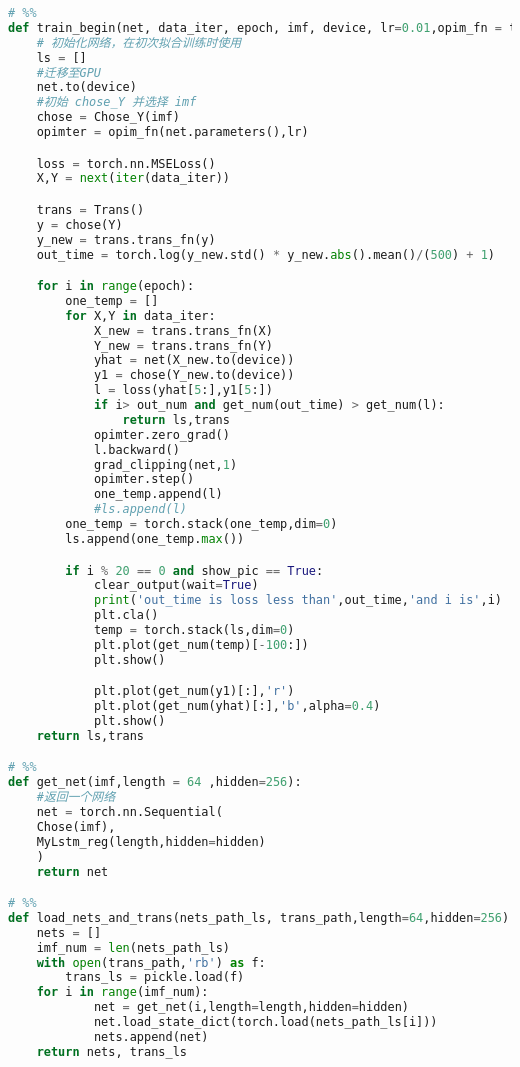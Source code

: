 \begin{appendices}
\begin{lstlisting}[language=python]
# %%
def train_begin(net, data_iter, epoch, imf, device, lr=0.01,opim_fn = torch.optim.Adam,out_num = 1000, show_pic = True):
    # 初始化网络，在初次拟合训练时使用
    ls = []
    #迁移至GPU
    net.to(device)
    #初始 chose_Y 并选择 imf
    chose = Chose_Y(imf)
    opimter = opim_fn(net.parameters(),lr)

    loss = torch.nn.MSELoss()
    X,Y = next(iter(data_iter))

    trans = Trans()
    y = chose(Y)
    y_new = trans.trans_fn(y)
    out_time = torch.log(y_new.std() * y_new.abs().mean()/(500) + 1)

    for i in range(epoch):
        one_temp = []
        for X,Y in data_iter:
            X_new = trans.trans_fn(X)
            Y_new = trans.trans_fn(Y)
            yhat = net(X_new.to(device))
            y1 = chose(Y_new.to(device))
            l = loss(yhat[5:],y1[5:])
            if i> out_num and get_num(out_time) > get_num(l):
                return ls,trans
            opimter.zero_grad()
            l.backward()
            grad_clipping(net,1)
            opimter.step()
            one_temp.append(l)
            #ls.append(l)
        one_temp = torch.stack(one_temp,dim=0)
        ls.append(one_temp.max())

        if i % 20 == 0 and show_pic == True:
            clear_output(wait=True)
            print('out_time is loss less than',out_time,'and i is',i)
            plt.cla()
            temp = torch.stack(ls,dim=0)
            plt.plot(get_num(temp)[-100:])
            plt.show()

            plt.plot(get_num(y1)[:],'r')
            plt.plot(get_num(yhat)[:],'b',alpha=0.4)
            plt.show()
    return ls,trans

# %%
def get_net(imf,length = 64 ,hidden=256):
    #返回一个网络
    net = torch.nn.Sequential(
    Chose(imf),
    MyLstm_reg(length,hidden=hidden)
    )
    return net

# %%
def load_nets_and_trans(nets_path_ls, trans_path,length=64,hidden=256):
    nets = []
    imf_num = len(nets_path_ls)
    with open(trans_path,'rb') as f:
        trans_ls = pickle.load(f)
    for i in range(imf_num):
            net = get_net(i,length=length,hidden=hidden)
            net.load_state_dict(torch.load(nets_path_ls[i]))
            nets.append(net)
    return nets, trans_ls


\end{lstlisting}
\end{appendices}
